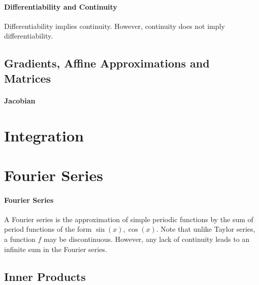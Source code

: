 \documentclass[12pt, letterpaper]{article}
\begin{document}
    \paragraph{Differentiability and Continuity} Differentiability implies continuity.
    However, continuity does not imply differentiability.

    \subsection{Gradients, Affine Approximations and Matrices}
    
    \paragraph{Jacobian}





    
    

    \section{Integration}


    \section{Fourier Series}
    \paragraph{Fourier Series}
    A Fourier series is the approximation of simple periodic functions by
    the sum of period functions of the form \(\sin(x), \cos(x)\).
    Note that unlike Taylor series, a function \(f\) may be discontinuous.
    However, any lack of continuity leads to an infinite sum in the Fourier series.
    
    \subsection{Inner Products}
\end{document}
